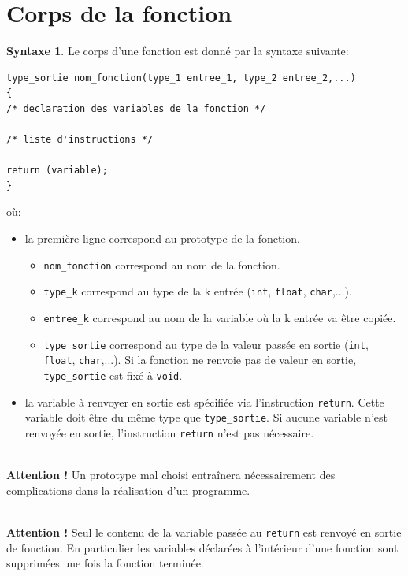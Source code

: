 \documentclass[a4paper,11pt]{book}
\newenvironment{warning} 
   {~\\ \textbf{Attention !}}{\\}
\theoremstyle{definition}
\newtheorem*{syntaxe}{Syntaxe}
\begin{document}
\section{Corps de la fonction} 
\begin{syntaxe}Le corps d'une fonction est donné
par la syntaxe suivante:
\begin{lstlisting}
type_sortie nom_fonction(type_1 entree_1, type_2 entree_2,...)
{
/* declaration des variables de la fonction */

/* liste d'instructions */

return (variable);
}
\end{lstlisting}
où:
\begin{itemize}
\item la première ligne correspond au prototype de la
fonction. 
\begin{itemize}
\item \texttt{nom\_fonction} correspond au nom de la fonction.
\item \texttt{type\_k} correspond au type de la k\ieme{} entrée (\texttt{int},
\texttt{float}, \texttt{char},...).
\item \texttt{entree\_k} correspond au nom de la variable où la k\ieme{} entrée va être copiée.
\item \texttt{type\_sortie} correspond au type de la valeur passée en sortie (\texttt{int},
\texttt{float}, \texttt{char},...). Si la fonction ne renvoie pas de valeur en
sortie, \texttt{type\_sortie} est fixé à \texttt{void}.
\end{itemize}
\item la variable à renvoyer en sortie est spécifiée via
l'instruction \texttt{return}. Cette variable doit être du même type que \texttt{type\_sortie}. Si aucune variable n'est renvoyée en
sortie, l'instruction \texttt{return} n'est pas nécessaire.\\
\end{itemize}

\begin{warning}
Un prototype mal choisi entraînera nécessairement des complications dans la réalisation d'un programme.
\end{warning}

\begin{warning}
Seul le contenu de la variable passée au \texttt{return} est renvoyé en sortie de fonction. En particulier les variables déclarées à l'intérieur d'une fonction sont supprimées une fois la fonction terminée.
\end{warning}

\end{syntaxe}
\end{document}
